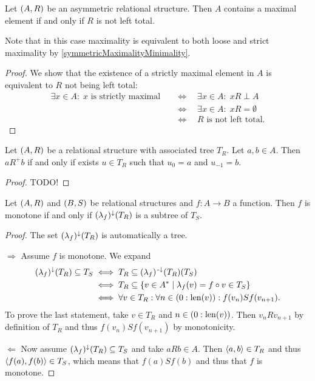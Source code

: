 \begin{lemma} \label{maximalElementNotLeftTotal}
Let $\sSet{A,R}$ be an asymmetric relational structure. Then $A$ contains a maximal element \textup{if and only if} $R$ is not left total.
\end{lemma}
Note that in this case maximality is equivalent to both loose and strict maximality by \ref{symmetricMaximalityMinimality}.
\begin{proof}
We show that the existence of a strictly maximal element in $A$ is equivalent to $R$ not being left total:
\begin{align*}
\exists x\in A: \; \text{$x$ is strictly maximal} \quad&\iff\quad \exists x \in A: \; xR\perp A \\
&\iff\quad \exists x \in A: \; xR = \emptyset \\
&\iff\quad \text{$R$ is not left total}.
\end{align*}
\end{proof}

\begin{lemma} \label{transitiveClosureSequenceLemma}
Let $\sSet{A,R}$ be a relational structure with associated tree $T_R$. Let $a,b\in A$. Then $aR^+b$ \textup{if and only if} exists $u\in T_R$ such that $u_0 = a$ and $u_{-1} = b$.
\end{lemma}
\begin{proof}
TODO!
\end{proof}

\begin{lemma} \label{monotoneFunctionSubAssociatedTree}
Let $\sSet{A,R}$ and $\sSet{B,S}$ be relational structures and $f: A\to B$ a function. Then $f$ is monotone \textup{if and only if} $(\lambda_f)^{\downarrow}(T_{R})$ is a subtree of $T_S$.
\end{lemma}
\begin{proof}
The set $(\lambda_f)^{\downarrow}(T_{R})$ is automatically a tree.

$\boxed{\Rightarrow}$ 
Assume $f$ is monotone. We expand
\begin{align*}
(\lambda_f)^{\imf}(T_{R}) \subseteq T_S &\iff T_R \subseteq (\lambda_f)^{\preimf}(T_{R})(T_S) \\
&\iff T_R \subseteq \setbuilder{v \in A^*}{\lambda_f(v) = f\circ v \in T_S} \\ 
&\iff \forall v\in T_R: \forall n\in (0:\len(v)): f(v_n)Sf(v_{n+1}).
\end{align*}
To prove the last statement, take $v\in T_R$ and $n\in (0:\operatorname{len}(v))$. Then $v_nRv_{n+1}$ by definition of $T_R$ and thus $f(v_n)Sf(v_{n+1})$ by monotonicity.

$\boxed{\Leftarrow}$ 
Now assume $(\lambda_f)^{\downarrow}(T_{R}) \subseteq T_S$ and take $aRb\in A$. Then $\left\langle a,b \right\rangle\in T_R$ and thus $\left\langle f(a), f(b) \right\rangle\in T_S$, which means that $f(a)Sf(b)$ and thus that $f$ is monotone.
\end{proof}

